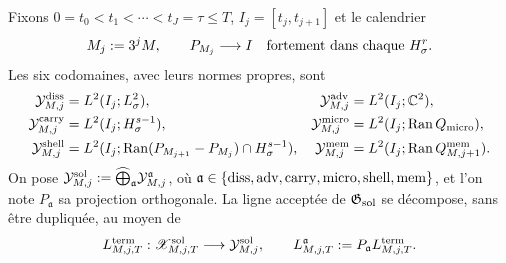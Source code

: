Fixons $0=t_0<t_1<\cdots<t_J=\tau\le T$, $I_j=[t_j,t_{j+1}]$ et le calendrier
\begin{equation}\label{eq:pdf2-ns-cutoff-calendar}
 M_j:=3^jM,
 \qquad P_{M_j}\longrightarrow I
 \quad\hbox{fortement dans chaque }H^r_\sigma.
\end{equation}
Les six codomaines, avec leurs normes propres, sont
\begin{equation}\label{eq:pdf2-ns-six-loss-spaces}
 \begin{aligned}
 \mathcal Y_{M,j}^{\rm diss}&=L^2(I_j;L^2_\sigma),&
 \mathcal Y_{M,j}^{\rm adv}&=L^2(I_j;\mathbb C^2),\\
 \mathcal Y_{M,j}^{\rm carry}&=L^2(I_j;H^{s-1}_\sigma),&
 \mathcal Y_{M,j}^{\rm micro}&=L^2(I_j;\operatorname{Ran}Q_{\rm micro}),\\
 \mathcal Y_{M,j}^{\rm shell}
 &=L^2(I_j;\operatorname{Ran}(P_{M_{j+1}}-P_{M_j})\cap H^{s-1}_\sigma),&
 \mathcal Y_{M,j}^{\rm mem}
 &=L^2(I_j;\operatorname{Ran}Q^{\rm mem}_{M,j+1}).
 \end{aligned}
\end{equation}
On pose
$\mathcal Y_{M,j}^{\rm sol}:=\widehat\bigoplus_{\mathfrak a}
\mathcal Y_{M,j}^{\mathfrak a}$, où
$\mathfrak a\in\{{\rm diss,adv,carry,micro,shell,mem}\}$, et l'on note
$P_{\mathfrak a}$ sa projection orthogonale. La ligne acceptée de
$\mathfrak G_{\rm sol}$ se décompose, sans être dupliquée, au moyen de
\begin{equation}\label{eq:pdf2-ns-loss-parseval}
 L_{M,j,T}^{\rm term}:
 \mathscr X_{M,j,T}^{\rm sol}\longrightarrow\mathcal Y_{M,j}^{\rm sol},
 \qquad
 L_{M,j,T}^{\mathfrak a}:=P_{\mathfrak a}L_{M,j,T}^{\rm term}.
\end{equation}

